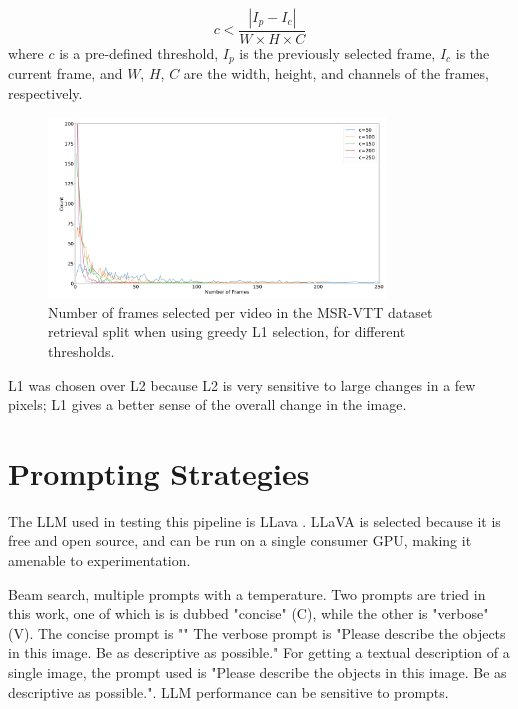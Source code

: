 \begin{equation}
      c < \frac{|I_{p} - I_{c}|}{W \times H \times C}
\end{equation}
where $c$ is a pre-defined threshold, $I_{p}$ is the previously selected frame, $I_{c}$ is the current frame, and $W$, $H$, $C$ are the width, height, and channels of the frames, respectively.

\begin{figure}
      \centering
      \includegraphics[width=0.8\textwidth]{figures/num_frames_histogram.png}
      \caption{Number of frames selected per video in the MSR-VTT dataset retrieval split when using greedy L1 selection, for different thresholds.}
      \label{fig:optical_flow}
\end{figure}

L1 was chosen over L2 because L2 is very sensitive to large changes in a few pixels; L1 gives a better sense of the overall change in the image.

\section{Prompting Strategies}

The LLM used in testing this pipeline is LLava \cite{llava}.
LLaVA is selected because it is free and open source, and can be run on a single consumer GPU, making it amenable to experimentation.

Beam search, multiple prompts with a temperature.
Two prompts are tried in this work, one of which is is dubbed "concise" (C), while the other is "verbose" (V).
The concise prompt is ""
The verbose prompt is "Please describe the objects in this image. Be as descriptive as possible."
For getting a textual description of a single image, the prompt used is "Please describe the objects in this image. Be as descriptive as possible.".
LLM performance can be sensitive to prompts.

